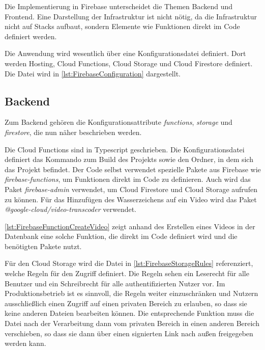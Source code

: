 Die Implementierung in Firebase unterscheidet die Themen Backend und Frontend. Eine Darstellung der Infrastruktur ist nicht nötig, da die Infrastruktur nicht auf Stacks aufbaut, sondern Elemente wie Funktionen direkt im Code definiert werden.

Die Anwendung wird wesentlich über eine Konfigurationsdatei definiert. Dort werden Hosting, Cloud Functions, Cloud Storage und Cloud Firestore definiert. Die Datei wird in \autoref{lst:FirebaseConfiguration} dargestellt.



\subsection{Backend}

Zum Backend gehören die Konfigurationsattribute \textit{functions}, \textit{storage} und \textit{firestore}, die nun näher beschrieben werden.

Die Cloud Functions sind in Typescript geschrieben. Die Konfigurationsdatei definiert das Kommando zum Build des Projekts sowie den Ordner, in dem sich das Projekt befindet. Der Code selbst verwendet spezielle Pakete aus Firebase wie \textit{firebase-functions}, um Funktionen direkt im Code zu definieren. Auch wird das Paket \textit{firebase-admin} verwendet, um Cloud Firestore und Cloud Storage aufrufen zu können. Für das Hinzufügen des Wasserzeichens auf ein Video wird das Paket \textit{@google-cloud/video-transcoder} verwendet.

\autoref{lst:FirebaseFunctionCreateVideo} zeigt anhand des Erstellen eines Videos in der Datenbank eine solche Funktion, die direkt im Code definiert wird und die benötigten Pakete nutzt.



Für den Cloud Storage wird die Datei in \autoref{lst:FirebaseStorageRules} referenziert, welche Regeln für den Zugriff definiert. Die Regeln sehen ein Leserecht für alle Benutzer und ein Schreibrecht für alle authentifizierten Nutzer vor. Im Produktionsbetrieb ist es sinnvoll, die Regeln weiter einzuschränken und Nutzern ausschließlich einen Zugriff auf einen privaten Bereich zu erlauben, so dass sie keine anderen Dateien bearbeiten können. Die entsprechende Funktion muss die Datei nach der Verarbeitung dann vom privaten Bereich in einen anderen Bereich verschieben, so dass sie dann über einen signierten Link nach außen freigegeben werden kann.

